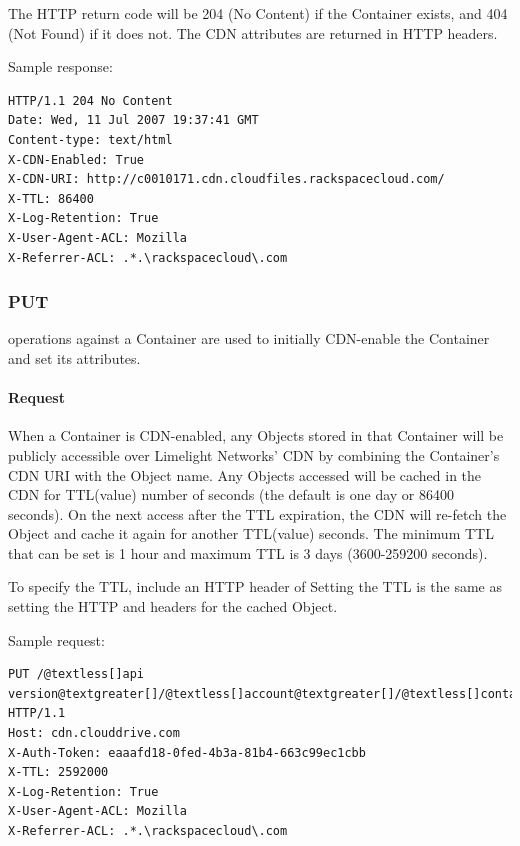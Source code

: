 \documentclass[letterpaper,10pt,english]{manual}
\begin{document}
The HTTP return code will be 204 (No Content) if the Container exists,
and 404 (Not Found) if it does not. The CDN attributes are returned in
HTTP headers.

Sample response:

\begin{Verbatim}[commandchars=@\[\]]
HTTP/1.1 204 No Content
Date: Wed, 11 Jul 2007 19:37:41 GMT
Content-type: text/html
X-CDN-Enabled: True
X-CDN-URI: http://c0010171.cdn.cloudfiles.rackspacecloud.com/
X-TTL: 86400
X-Log-Retention: True
X-User-Agent-ACL: Mozilla
X-Referrer-ACL: .*.\rackspacecloud\.com
\end{Verbatim}


\subsubsection{PUT}

 operations against a Container are used to initially CDN-enable
the Container and set its attributes.


\paragraph{Request}

When a Container is CDN-enabled, any Objects stored in that Container
will be publicly accessible over Limelight Networks' CDN by combining
the Container's CDN URI with the Object name.  Any Objects accessed will
be cached in the CDN for TTL(value) number of seconds (the default is one day or 86400 seconds).  On the next access after the TTL expiration, the CDN will
re-fetch the Object and cache it again for another TTL(value) seconds.  The minimum TTL that can be set is 1 hour and maximum TTL is 3 days (3600-259200
seconds).

To specify the TTL, include an HTTP header of 
Setting the TTL is the same as setting the HTTP  and
 headers for the cached Object.

Sample request:

\begin{Verbatim}[commandchars=@\[\]]
PUT /@textless[]api version@textgreater[]/@textless[]account@textgreater[]/@textless[]container@textgreater[] HTTP/1.1
Host: cdn.clouddrive.com
X-Auth-Token: eaaafd18-0fed-4b3a-81b4-663c99ec1cbb
X-TTL: 2592000
X-Log-Retention: True
X-User-Agent-ACL: Mozilla
X-Referrer-ACL: .*.\rackspacecloud\.com
\end{Verbatim}
\end{document}
